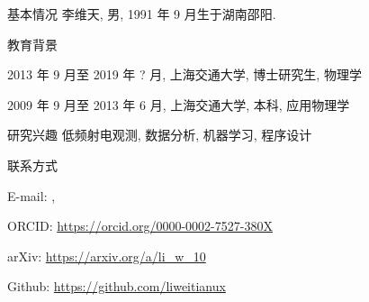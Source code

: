 
\begin{resume}
  \begin{resumesection}{基本情况}
    李维天, 男, 1991 年 9 月生于湖南邵阳.
  \end{resumesection}

  \begin{resumelist}{教育背景}
    \item 2013 年 9 月至 2019 年 ? 月, 上海交通大学, 博士研究生, 物理学
    \item 2009 年 9 月至 2013 年 6 月, 上海交通大学, 本科, 应用物理学
  \end{resumelist}

  \begin{resumesection}{研究兴趣}
    低频射电观测, 数据分析, 机器学习, 程序设计
  \end{resumesection}

  \begin{resumelist}{联系方式}
    \item E-mail:
      , \hspace{0.5em}
    \item ORCID: \url{https://orcid.org/0000-0002-7527-380X}
    \item arXiv: \url{https://arxiv.org/a/li_w_10}
    \item Github: \url{https://github.com/liweitianux}
  \end{resumelist}
\end{resume}
